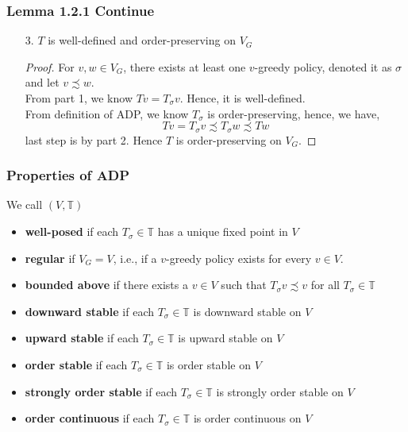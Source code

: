 \documentclass[11pt,xcolor={dvipsnames},hyperref={pdftex,pdfpagemode=UseNone,hidelinks,pdfdisplaydoctitle=true},usepdftitle=false]{beamer}
\begin{document}
\begin{frame}
\frametitle{Lemma 1.2.1 Continue}
\begin{lemma}
\begin{enumerate}
\item[3.] $T$ is well-defined and order-preserving on $V_G$
\begin{proof}
For $v, w\in V_G$, there exists at least one $v$-greedy policy, denoted it as $\sigma$ and let $v\precsim w$.\\
From part 1, we know $Tv = T_\sigma v$. Hence, it is well-defined.\\
From definition of ADP, we know $T_\sigma$ is order-preserving, hence, we have,
$$
T v = T_\sigma v \precsim T_\sigma w \precsim Tw
$$
last step is by part 2. Hence $T$ is order-preserving on $V_G$.
\end{proof}
\end{enumerate}
\end{lemma}
\end{frame}

\begin{frame}
\frametitle{Properties of ADP}
We call $(V,\mathbb{T})$
\begin{itemize}
\item \textbf{well-posed} if each $T_\sigma\in \mathbb{T}$ has a unique fixed point in $V$
\item \textbf{regular} if $V_G=V$, i.e., if a $v$-greedy policy exists for every $v\in V$.
\item \textbf{bounded above} if there exists a $v\in V$ such that $T_\sigma v\precsim v$ for all $T_\sigma\in \mathbb{T}$
\item \textbf{downward stable} if each $T_\sigma\in\mathbb{T}$ is downward stable on $V$
\item \textbf{upward stable} if each $T_\sigma\in\mathbb{T}$ is upward stable on $V$
\item \textbf{order stable} if each $T_\sigma\in\mathbb{T}$ is order stable on $V$
\item \textbf{strongly order stable} if each $T_\sigma\in \mathbb{T}$ is strongly order stable on $V$
\item \textbf{order continuous} if each $T_\sigma\in \mathbb{T}$ is order continuous on $V$
\end{itemize}
\end{frame}
\end{document}
